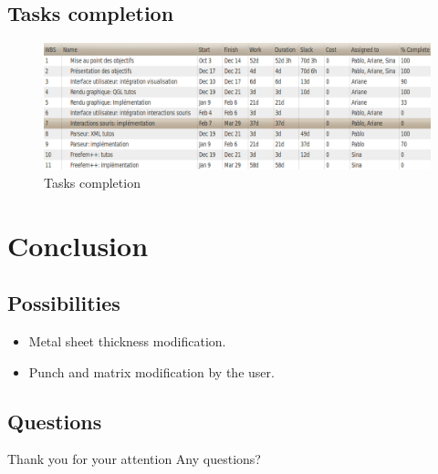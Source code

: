 \documentclass{beamer}
\begin{document}
\subsection{Tasks completion}
\begin{frame}
    \begin{figure}
        \includegraphics[width=\textwidth]{img/ganttCompletionTasks.png}
        \caption{Tasks completion}
        \label{Complétion}
    \end{figure}
\end{frame}

\section{Conclusion}
\subsection{Possibilities}
\begin{frame}
    \begin{itemize}
        \item Metal sheet thickness modification.
        \item Punch and matrix modification by the user.
    \end{itemize}
\end{frame}
\subsection{Questions}
\begin{frame}
    Thank you for your attention
    \hfill Any questions?
\end{frame}
\end{document}
